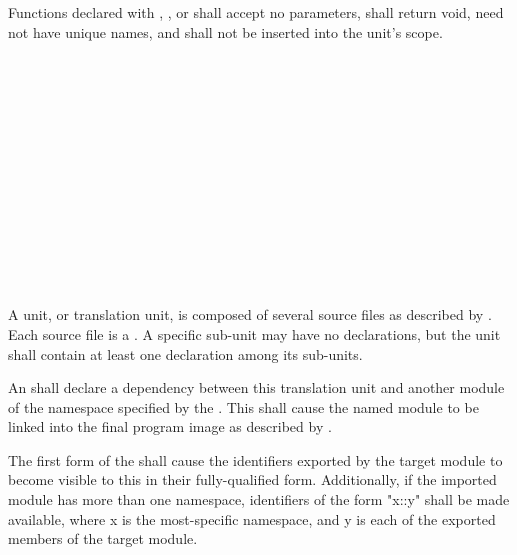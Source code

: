 \specsubsubitem
Functions declared with , , or 
shall accept no parameters, shall return void, need not have unique names, and
shall not be inserted into the unit's scope.


\begin{grammar}
\\
	 \\

\\
	 \\

\\
	  \terminal{;}\\
	  \terminal{=}  \terminal{;}\\
	  \terminal{::} \terminal{\{}  \terminal{\}} \terminal{;}\\
	  \terminal{::} \terminal{*} \terminal{;}\\

\\
	 \optional{\terminal{,}}\\
	 \terminal{,} \\
\end{grammar}

\specsubitem
A unit, or translation unit, is composed of several source files as described
by . Each source file is a .
A specific sub-unit may have no declarations, but the unit shall contain at
least one declaration among its sub-units.

\specsubitem
An  shall declare a dependency between this translation
unit and another module of the namespace specified by the
 . This shall cause the named
module to be linked into the final program image as described by
.

\specsubitem
The first form of the  shall cause the identifiers
exported by the target module to become visible to this 
in their fully-qualified form. Additionally, if the imported module has more
than one namespace, identifiers of the form "x::y" shall be made available,
where x is the most-specific namespace, and y is each of the exported members
of the target module.

